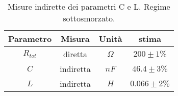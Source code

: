 \begin{table}[H]
\begin{center}
\begin{tabular}{|c|c|c|c|}
\hline

Parametro & Misura & Unità & stima \\ \hline

$R_{tot}$ & diretta & $\Omega$ & $200\pm1\%$ \\ 

$C$ & indiretta & $nF$ & $46.4\pm3\%$ \\ 

$L$ & indiretta & $H$ & $0.066\pm2\%$ \\ 

\hline
\end{tabular}
\end{center}
\caption{
Misure indirette dei parametri C e L.
Regime sottosmorzato.
}
\label{C4_P1_sotto_fit}
\end{table}
